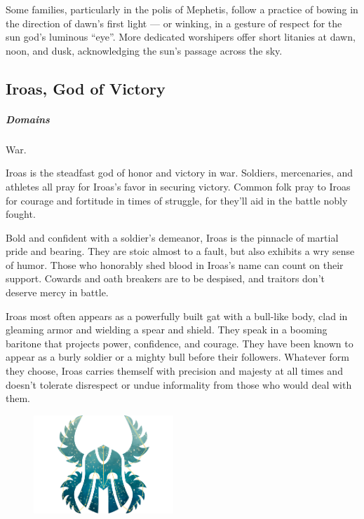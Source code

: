         Some families, particularly in the polis of Mephetis, follow a practice of bowing in the direction of dawn's first light --- or winking, in a gesture of respect for the sun god's luminous ``eye''.
        More dedicated worshipers offer short litanies at dawn, noon, and dusk, acknowledging the sun's passage across the sky.

\subsection*{Iroas, God of Victory} \label{ssec::iroas}
    \subparagraph{Domains} War.

    Iroas is the steadfast god of honor and victory in war.
    Soldiers, mercenaries, and athletes all pray for Iroas's favor in securing victory.
    Common folk pray to Iroas for courage and fortitude in times of struggle, for they'll aid in the battle nobly fought.

    Bold and confident with a soldier's demeanor, Iroas is the pinnacle of martial pride and bearing.
    They are stoic almost to a fault, but also exhibits a wry sense of humor.
    Those who honorably shed blood in Iroas's name can count on their support.
    Cowards and oath breakers are to be despised, and traitors don't deserve mercy in battle.

    Iroas most often appears as a powerfully built gat with a bull-like body, clad in gleaming armor and wielding a spear and shield.
    They speak in a booming baritone that projects power, confidence, and courage.
    They have been known to appear as a burly soldier or a mighty bull before their followers.
    Whatever form they choose, Iroas carries themself with precision and majesty at all times and doesn't tolerate disrespect or undue informality from those who would deal with them.

    \begin{figure}[t]
        \centering
        \includegraphics[width=0.47\textwidth]{02viphoger/img/10s_iroas.png}
    \end{figure}


